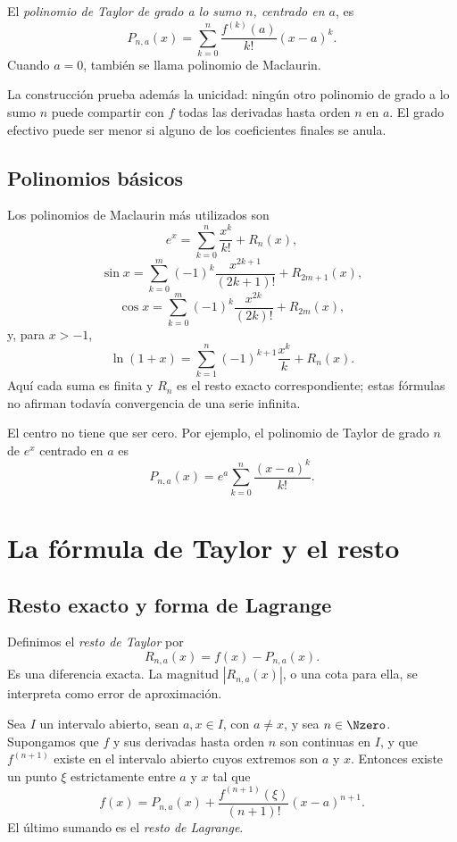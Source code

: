 \begin{definicion}
El \emph{polinomio de Taylor de grado a lo sumo \(n\), centrado en \(a\)}, es
\[
  P_{n,a}(x)=\sum_{k=0}^{n}\frac{f^{(k)}(a)}{k!}(x-a)^k.
\]
Cuando \(a=0\), también se llama polinomio de Maclaurin.
\end{definicion}

La construcción prueba además la unicidad: ningún otro polinomio de grado a
lo sumo \(n\) puede compartir con \(f\) todas las derivadas hasta orden \(n\)
en \(a\). El grado efectivo puede ser menor si alguno de los coeficientes
finales se anula.

\subsection{Polinomios básicos}

Los polinomios de Maclaurin más utilizados son
\[
  e^x=\sum_{k=0}^{n}\frac{x^k}{k!}+R_n(x),
\]
\[
  \sin x=\sum_{k=0}^{m}(-1)^k\frac{x^{2k+1}}{(2k+1)!}
          +R_{2m+1}(x),
\]
\[
  \cos x=\sum_{k=0}^{m}(-1)^k\frac{x^{2k}}{(2k)!}
          +R_{2m}(x),
\]
y, para \(x>-1\),
\[
  \ln(1+x)=\sum_{k=1}^{n}(-1)^{k+1}\frac{x^k}{k}+R_n(x).
\]
Aquí cada suma es finita y \(R_n\) es el resto exacto correspondiente; estas
fórmulas no afirman todavía convergencia de una serie infinita.

El centro no tiene que ser cero. Por ejemplo, el polinomio de Taylor de
grado \(n\) de \(e^x\) centrado en \(a\) es
\[
  P_{n,a}(x)=e^a\sum_{k=0}^{n}\frac{(x-a)^k}{k!}.
\]

\section{La fórmula de Taylor y el resto}
\label{sec:formula-taylor-resto}

\subsection{Resto exacto y forma de Lagrange}

Definimos el \emph{resto de Taylor} por
\[
  R_{n,a}(x)=f(x)-P_{n,a}(x).
\]
Es una diferencia exacta. La magnitud \(|R_{n,a}(x)|\), o una cota para ella,
se interpreta como error de aproximación.

\begin{teorema}
Sea \(I\) un intervalo abierto, sean \(a,x\in I\), con \(a\ne x\), y sea
\(n\in\Nzero\). Supongamos que \(f\) y sus derivadas hasta orden \(n\) son
continuas en \(I\), y que \(f^{(n+1)}\) existe en el intervalo abierto cuyos
extremos son \(a\) y \(x\). Entonces existe un punto \(\xi\) estrictamente
entre \(a\) y \(x\)
tal que
\[
  f(x)=P_{n,a}(x)
       +\frac{f^{(n+1)}(\xi)}{(n+1)!}(x-a)^{n+1}.
\]
El último sumando es el \emph{resto de Lagrange}.
\end{teorema}

